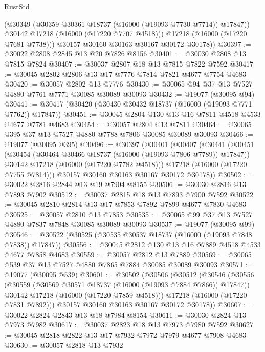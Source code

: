 \begin{lexlean}{RustStd}
\begin{coremodule}
            (@30349 (@30359 @30361 @18737 (@16000 (@19093 @7730 @7714)) @17847))
            @30142
            @17218
            (@16000 (@17220 @7707 @4518)))
          @17218
          (@16000 (@17220 @7681 @7738)))
        @30157
        @30160
        @30163
        @30167
        @30172
        @30178))
@30397 := @30022 @2808 @2845 @13 @20 @7826 @8156
@30401 := @30030 @2808 @13 @7815 @7824
@30407 := @30037 @2807 @18 @13 @7815 @7822 @7592
@30417 := @30045 @2802 @2806 @13 @17 @7776 @7814 @7821 @4677 @7754 @4683
@30420 := @30057 @2802 @13 @7776
@30430 := @30065 @94 @37 @13 @7527 @4880 @7761 @7771 @30085 @30089 @30093
@30432 := @19077 (@30095 @94)
@30441 := @30417 (@30420 (@30430 @30432 @18737 (@16000 (@19093 @7771 @7762)) @17847))
@30451 := @30045 @2804 @130 @13 @16 @7811 @4518 @4533 @4677 @7781 @4683
@30454 := @30057 @2804 @13 @7811
@30464 := @30065 @395 @37 @13 @7527 @4880 @7788 @7806 @30085 @30089 @30093
@30466 := @19077 (@30095 @395)
@30496 := @30397
    (@30401
      (@30407
        (@30441
          (@30451
            (@30454 (@30464 @30466 @18737 (@16000 (@19093 @7806 @7789)) @17847))
            @30142
            @17218
            (@16000 (@17220 @7782 @4518)))
          @17218
          (@16000 (@17220 @7755 @7814)))
        @30157
        @30160
        @30163
        @30167
        @30172
        @30178))
@30502 := @30022 @2816 @2844 @13 @19 @7904 @8155
@30506 := @30030 @2816 @13 @7893 @7902
@30512 := @30037 @2815 @18 @13 @7893 @7900 @7592
@30522 := @30045 @2810 @2814 @13 @17 @7853 @7892 @7899 @4677 @7830 @4683
@30525 := @30057 @2810 @13 @7853
@30535 := @30065 @99 @37 @13 @7527 @4880 @7837 @7848 @30085 @30089 @30093
@30537 := @19077 (@30095 @99)
@30546 := @30522 (@30525 (@30535 @30537 @18737 (@16000 (@19093 @7848 @7838)) @17847))
@30556 := @30045 @2812 @130 @13 @16 @7889 @4518 @4533 @4677 @7858 @4683
@30559 := @30057 @2812 @13 @7889
@30569 := @30065 @539 @37 @13 @7527 @4880 @7865 @7884 @30085 @30089 @30093
@30571 := @19077 (@30095 @539)
@30601 := @30502
    (@30506
      (@30512
        (@30546
          (@30556
            (@30559 (@30569 @30571 @18737 (@16000 (@19093 @7884 @7866)) @17847))
            @30142
            @17218
            (@16000 (@17220 @7859 @4518)))
          @17218
          (@16000 (@17220 @7831 @7892)))
        @30157
        @30160
        @30163
        @30167
        @30172
        @30178))
@30607 := @30022 @2824 @2843 @13 @18 @7984 @8154
@30611 := @30030 @2824 @13 @7973 @7982
@30617 := @30037 @2823 @18 @13 @7973 @7980 @7592
@30627 := @30045 @2818 @2822 @13 @17 @7932 @7972 @7979 @4677 @7908 @4683
@30630 := @30057 @2818 @13 @7932

\end{coremodule}
\end{lexlean}
